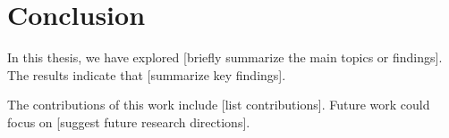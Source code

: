 \chapter{Conclusion}\label{ch:conclusion}
In this thesis, we have explored [briefly summarize the main topics or findings]. The results indicate that [summarize key findings]. 

The contributions of this work include [list contributions]. Future work could focus on [suggest future research directions].
